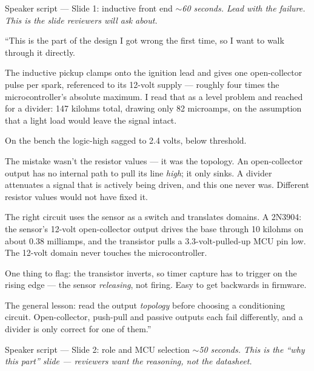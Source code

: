 \documentclass[aspectratio=169,11pt]{beamer}
\begin{document}
{
\begin{frame}{Speaker script --- Slide 1: inductive front end}
\scriptsize
\textit{\color{dim}$\sim$60 seconds. Lead with the failure. This is the slide reviewers
will ask about.}
\medskip

``This is the part of the design I got wrong the first time, so I want to walk
through it directly.

The inductive pickup clamps onto the ignition lead and gives one open-collector
pulse per spark, referenced to its 12-volt supply --- roughly four times the
microcontroller's absolute maximum. I read that as a level problem and reached for a
divider: 147 kilohms total, drawing only 82 microamps, on the assumption that a light
load would leave the signal intact.

On the bench the logic-high sagged to 2.4 volts, below threshold.

The mistake wasn't the resistor values --- it was the topology. An open-collector
output has no internal path to pull its line \emph{high}; it only sinks. A divider
attenuates a signal that is actively being driven, and this one never was. Different
resistor values would not have fixed it.

The right circuit uses the sensor as a switch and translates domains. A 2N3904: the
sensor's 12-volt open-collector output drives the base through 10 kilohms on about
0.38 milliamps, and the transistor pulls a 3.3-volt-pulled-up MCU pin low. The
12-volt domain never touches the microcontroller.

One thing to flag: the transistor inverts, so timer capture has to trigger on the
rising edge --- the sensor \emph{releasing}, not firing. Easy to get backwards in
firmware.

The general lesson: read the output \emph{topology} before choosing a conditioning
circuit. Open-collector, push-pull and passive outputs each fail differently, and a
divider is only correct for one of them.''
\end{frame}

\begin{frame}{Speaker script --- Slide 2: role and MCU selection}
\scriptsize
\textit{\color{dim}$\sim$50 seconds. This is the ``why this part'' slide --- reviewers
want the reasoning, not the datasheet.}
\medskip


\end{frame}}
\end{document}
